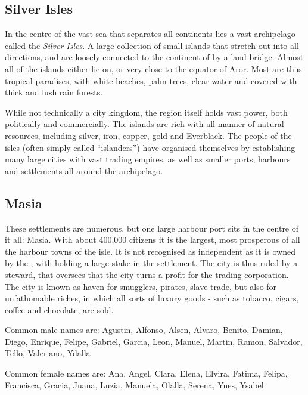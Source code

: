 \subsection{Silver Isles}
\label{sec:Silver Isles}

In the centre of the vast sea that separates all continents lies a vast
archipelago called the \emph{Silver Isles}. A large collection of small
islands that stretch out into all directions, and are loosely connected to the
continent of  by a land bridge. Almost all of the islands
either lie on, or very close to the equator of \hyperref[sec:Aror]{Aror}. Most
are thus tropical paradises, with white beaches, palm trees, clear water and
covered with thick and lush rain forests.

While not technically a city kingdom, the region itself holds vast power,
both politically and commercially. The islands are rich with all manner of
natural resources, including silver, iron, copper, gold and Everblack. The
people of the isles (often simply called ``islanders'') have organised
themselves by establishing many large cities with vast trading empires,
as well as smaller ports, harbours and settlements all around the archipelago.

\subsection{Masia}
\label{sec:Masia}

These settlements are numerous, but one large harbour port sits in the centre
of it all: Masia. With about 400,000 citizens it is the largest, most
prosperous of all the harbour towns of the isle. It is not recognised as
independent as it is owned by the ,
with  holding a large stake in the settlement. The
city is thus ruled by a steward, that oversees that the city turns a profit
for the trading corporation. The city is known as haven for smugglers, pirates,
slave trade, but also for unfathomable riches, in which all sorts of luxury
goods - such as tobacco, cigars, coffee and chocolate, are sold.

Common male names are: Agustin, Alfonso, Alsen, Alvaro, Benito, Damian, Diego,
Enrique, Felipe, Gabriel, Garcia, Leon, Manuel, Martin, Ramon, Salvador, Tello,
Valeriano, Ydalla

Common female names are: Ana, Angel, Clara, Elena, Elvira, Fatima, Felipa,
Francisca, Gracia, Juana, Luzia, Manuela, Olalla, Serena, Ynes, Ysabel

